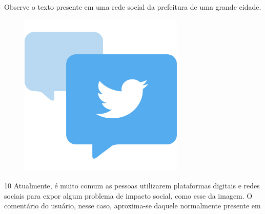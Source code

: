 Observe o texto presente em uma rede social da prefeitura de
uma grande cidade.

\begin{myquote}
\begin{figure}[H]
\centering\includegraphics[width=0.7\textwidth]{./imgSAEB_6_POR/freepik/PORT_6_IMG-13.jpeg}
\end{figure}
\end{myquote}


\num{10} Atualmente, é muito comum as pessoas utilizarem plataformas digitais e
redes sociais para expor algum problema de impacto social, como esse da
imagem. O comentário do usuário, nesse caso, aproxima-se daquele
normalmente presente em

